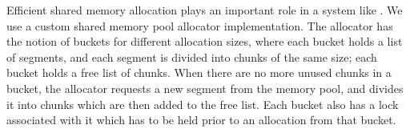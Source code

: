 Efficient shared memory allocation plays an important role in a system
like \varan.  We use a custom shared memory pool allocator implementation.
The allocator has the notion of buckets for different allocation sizes,
where each bucket holds a list of segments, and each segment is
divided into chunks of the same size; each bucket holds a free list of
chunks.  When there are no more unused chunks in a bucket, the
allocator requests a new segment from the memory pool, and divides it
into chunks which are then added to the free list. Each bucket also
has a lock associated with it which has to be held prior to an
allocation from that bucket. 




